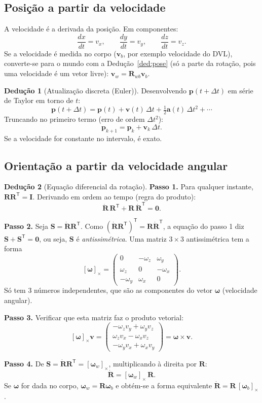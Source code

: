 \documentclass[11pt,a4paper]{article}
\newcommand{\vv}[1]{\mathbf{#1}}              %
\newcommand{\col}[3]{\begin{pmatrix}#1\\#2\\#3\end{pmatrix}}
\newcommand{\Rot}{\mathbf{R}}
\newcommand{\Id}{\mathbf{I}}
\newcommand{\T}{^{\mathsf{T}}}
\theoremstyle{definition}
\newtheorem{deducao}{Dedução}[section]
\begin{document}
\subsection{Posição a partir da velocidade}
A velocidade é a derivada da posição. Em componentes:
\[
\frac{dx}{dt}=v_x,\qquad \frac{dy}{dt}=v_y,\qquad \frac{dz}{dt}=v_z .
\]
Se a velocidade é medida no corpo ($\vv{v}_b$, por exemplo velocidade do DVL), converte-se para o mundo com a Dedução~\ref{ded:pose} (só a parte da rotação, pois uma velocidade é um vetor livre): $\vv{v}_w=\Rot_{wb}\vv{v}_b$.

\begin{deducao}[Atualização discreta (Euler)]
Desenvolvendo $\vv{p}(t+\Delta t)$ em série de Taylor em torno de $t$:
\[
\vv{p}(t+\Delta t)=\vv{p}(t)+\vv{v}(t)\,\Delta t+\tfrac12\vv{a}(t)\,\Delta t^2+\cdots
\]
Truncando no primeiro termo (erro de ordem $\Delta t^2$):
\[
\vv{p}_{k+1}=\vv{p}_k+\vv{v}_k\,\Delta t .
\]
Se a velocidade for constante no intervalo, é exato.
\end{deducao}

\subsection{Orientação a partir da velocidade angular}
\begin{deducao}[Equação diferencial da rotação]\label{ded:rotode}
\textbf{Passo 1.} Para qualquer instante, $\Rot\Rot\T=\Id$. Derivando em ordem ao tempo (regra do produto):
\[
\dot{\Rot}\,\Rot\T+\Rot\,\dot{\Rot}\T=\mathbf{0}.
\]

\textbf{Passo 2.} Seja $\mathbf{S}=\dot{\Rot}\Rot\T$. Como $(\dot{\Rot}\Rot\T)\T=\Rot\dot{\Rot}\T$, a equação do passo 1 diz $\mathbf{S}+\mathbf{S}\T=\mathbf{0}$, ou seja, $\mathbf{S}$ é \emph{antissimétrica}. Uma matriz $3\times3$ antissimétrica tem a forma
\[
[\vv{\omega}]_\times=\begin{pmatrix}0&-\omega_z&\omega_y\\ \omega_z&0&-\omega_x\\ -\omega_y&\omega_x&0\end{pmatrix}.
\]
Só tem 3 números independentes, que são as componentes do vetor $\vv{\omega}$ (velocidade angular).

\textbf{Passo 3.} Verificar que esta matriz faz o produto vetorial: 
\[
[\vv{\omega}]_\times\vv{v}=\col{-\omega_z v_y+\omega_y v_z}{\omega_z v_x-\omega_x v_z}{-\omega_y v_x+\omega_x v_y}=\vv{\omega}\times\vv{v}.
\]

\textbf{Passo 4.} De $\mathbf{S}=\dot{\Rot}\Rot\T=[\vv{\omega}_w]_\times$, multiplicando à direita por $\Rot$:
\[
\dot{\Rot}=[\vv{\omega}_w]_\times\,\Rot .
\]
Se $\vv{\omega}$ for dada no corpo, $\vv{\omega}_w=\Rot\vv{\omega}_b$ e obtém-se a forma equivalente $\dot{\Rot}=\Rot\,[\vv{\omega}_b]_\times$.
\end{deducao}
\end{document}
